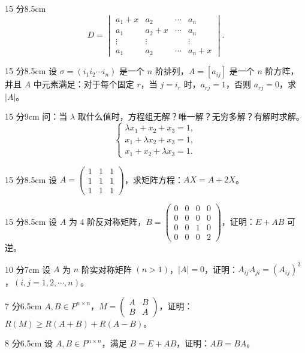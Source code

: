 
\begin{problem}{15 分}{8.5cm}
\[
D=\begin{vmatrix}
a_1+x&a_2&\cdots&a_n\\
a_1&a_2+x&\cdots&a_n\\
\vdots&\vdots&&\vdots\\
a_1&a_2&\cdots&a_n+x
\end{vmatrix}.
\]
\end{problem}

\begin{problem}{15 分}{8.5cm}
设 $\sigma=(i_1i_2\cdots i_n)$ 是一个 $n$ 阶排列，$A=[a_{ij}]$ 是一个 $n$ 阶方阵，并且 $A$ 中元素满足：对于每个固定 $r$，当 $j=i_r$ 时，$a_{rj}=1$，否则 $a_{rj}=0$，求 $|A|$。
\end{problem}

\begin{problem}{15 分}{9cm}
问：当 $\lambda$ 取什么值时，方程组无解？唯一解？无穷多解？有解时求解。
\[
\begin{cases}
\lambda x_1+x_2+x_3=1,\\
x_1+\lambda x_2+x_3=1,\\
x_1+x_2+\lambda x_3=1.
\end{cases}
\]
\end{problem}

\begin{problem}{15 分}{8.5cm}
设 $A=\begin{pmatrix}1&1&1\\1&1&1\\1&1&1\end{pmatrix}$，求矩阵方程：$AX=A+2X$。
\end{problem}

\begin{problem}{15 分}{8.5cm}
设 $A$ 为 $4$ 阶反对称矩阵，$B=\begin{pmatrix}0&0&0&0\\0&0&0&0\\0&0&1&0\\0&0&0&2\end{pmatrix}$，证明：$E+AB$ 可逆。
\end{problem}

\begin{problem}{10 分}{7cm}
设 $A$ 为 $n$ 阶实对称矩阵 $(n>1)$，$|A|=0$，证明：$A_{ij}A_{ji}=(A_{ij})^{2}$，$(i,j=1,2,\cdots,n)$。
\end{problem}

\begin{problem}{7 分}{6.5cm}
$A,B\in P^{n\times n}$，$M=\begin{pmatrix}A&B\\B&A\end{pmatrix}$，证明：$R(M)\ge R(A+B)+R(A-B)$。
\end{problem}

\begin{problem}{8 分}{6.5cm}
设 $A,B\in P^{n\times n}$，满足 $B=E+AB$，证明：$AB=BA$。
\end{problem}
